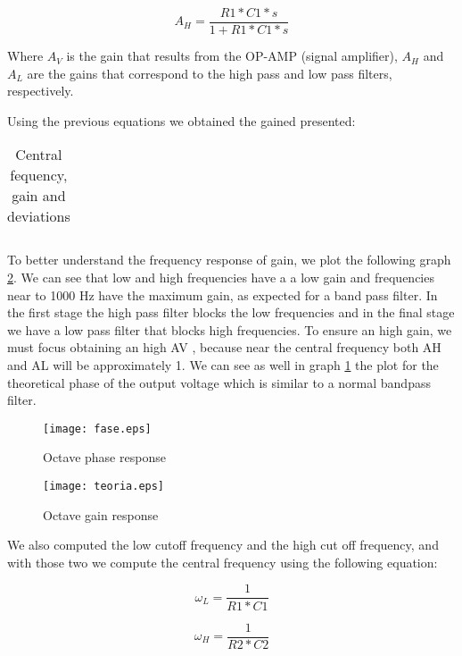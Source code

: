 \begin{equation}
A_{H}=  \frac{R1*C1*s}{1+R1*C1*s}
\end{equation}

Where $A_V$ is the gain that results from the OP-AMP (signal amplifier), $A_H$ and $A_L$ are the gains that correspond to the high pass and low pass filters, respectively.

Using the previous equations we obtained the gained presented:

\begin{table}[H]
\centering
\begin{tabularx}{0.6\textwidth} {
  | >{\raggedright\arraybackslash}X
  | >{\raggedleft\arraybackslash}X | }
 \hline

\end{tabularx}
\caption{Central fequency, gain and deviations}
\end{table}

To better understand the frequency response of gain, we plot the following graph \ref{fig:gain}.  We can see that low and high frequencies have a a low gain and frequencies near to 1000 Hz have the maximum gain, as expected for a band pass filter.
In the first stage the high pass filter blocks the low frequencies and in the final stage we have a low pass filter that blocks high frequencies. To ensure an high gain, we must focus obtaining an high AV , because near the central frequency both AH and AL will be approximately 1. We can see as well in graph \ref{fig:freq} the plot for the theoretical phase of the output voltage which is similar to a normal bandpass filter.

\begin{figure}[H] \centering
\texttt{[image: fase.eps]}
\caption{Octave phase response}
\label{fig:freq}
\end{figure}

\begin{figure}[H] \centering
\texttt{[image: teoria.eps]}
\caption{Octave gain response}
\label{fig:gain}
\end{figure}
We also computed the low cutoff frequency and the high cut off frequency, and with those two we compute the central frequency using the following equation:

\begin{equation}
\omega_{L}= \frac{1}{R1*C1}
\end{equation}

\begin{equation}
\omega_{H}= \frac{1}{R2*C2}
\end{equation}

